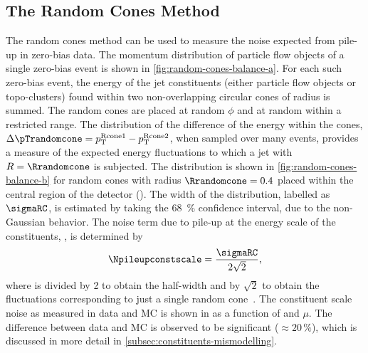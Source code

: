 


\subsection{The Random Cones Method}
\label{subsec:random-cones-method}

The random cones method can be used to measure the noise expected from pile-up in zero-bias data. The momentum distribution of particle flow objects of a single zero-bias event is shown in \cref{fig:random-cones-balance-a}. 
For each such zero-bias event, the energy of the jet constituents (either particle flow objects or topo-clusters) found within two non-overlapping circular cones of radius \Rrandomcone is summed. 
The random cones are placed at random $\phi$ and at random \abseta within a restricted range.
The distribution of the difference of the energy within the cones, $\Delta \pTrandomcone = p_{\text{T}}^{\text{Rcone1}} - p_{\text{T}}^\text{Rcone2}$, when sampled over many events, provides a measure of the expected energy fluctuations to which a jet with $R = \Rrandomcone$ is subjected.
The distribution is shown in \cref{fig:random-cones-balance-b} for random cones with radius $\Rrandomcone = 0.4$ placed within the central region of the detector (). The width of the distribution, labelled as $\sigmaRC$, is estimated by taking the \SI{68}{\percent} confidence interval, due to the non-Gaussian behavior.
The noise term due to pile-up at the energy scale of the constituents, \Npileupconstscale, is determined by 
\begin{equation}
    \Npileupconstscale = \frac{\sigmaRC}{2\sqrt{2}},
\end{equation}
where \sigmaRC is divided by 2 to obtain the half-width and by $\sqrt{2}$ to obtain the fluctuations corresponding to just a single random cone~\cite{JETM-2018-05}. 
The constituent scale noise as measured in data and MC is shown in  as a function of \abseta and $\mu$.
The difference between data and MC is observed to be significant ($\approx 20\,\%$), which is discussed in more detail in \cref{subsec:constituents-mismodelling}. 


